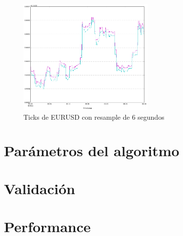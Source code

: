 \begin{figure}[h!t]
    \begin{center}
        \includegraphics[width=0.6\textwidth]{images/eurusd_6s}
        \caption{Ticks de EURUSD con resample de 6 segundos}
        \label{fig:eurusd_r6s}
    \end{center}
\end{figure}

\section{Parámetros del algoritmo}
\section{Validación}
\section{Performance}
